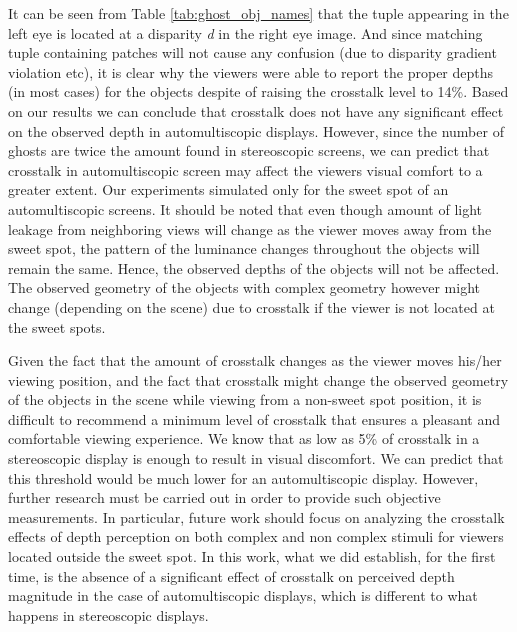 It can be seen from Table \ref{tab:ghost_obj_names} that the tuple appearing in the left eye is located at a disparity \emph{d} in the right eye image. And since matching tuple containing patches will not cause any confusion (due to disparity gradient violation etc), it is clear why the viewers were able to report the proper depths (in most cases) for the objects despite of raising the crosstalk level to 14\%. Based on our results we can conclude that crosstalk does not have any significant effect on the observed depth in automultiscopic displays. However, since the number of ghosts are twice the amount found in stereoscopic screens, we can predict that crosstalk in automultiscopic screen may affect the viewers visual comfort to a greater extent. Our experiments simulated only for the sweet spot of an automultiscopic screens. It should be noted that even though amount of light leakage from neighboring views will change as the viewer moves away from the sweet spot, the pattern of the luminance changes throughout the objects will remain the same. Hence, the observed depths of the objects will not be affected. The observed geometry of the objects with complex geometry however might change (depending on the scene) due to crosstalk if the viewer is not located at the sweet spots.

Given the fact that the amount of crosstalk changes as the viewer moves his/her viewing position, and the fact that crosstalk might change the observed geometry of the objects in the scene while viewing from a non-sweet spot position, it is difficult to recommend a minimum level of crosstalk that ensures a pleasant and comfortable viewing experience. We know that as low as 5\% of crosstalk in a stereoscopic display is enough to result in visual discomfort. We can predict that this threshold would be much lower for an automultiscopic display. However, further research must be carried out in order to provide such objective measurements. In particular, future work should focus on analyzing the crosstalk effects of depth perception on both complex and non complex stimuli for viewers located outside the sweet spot. In this work, what we did establish, for the first time, is the absence of a significant effect of crosstalk on perceived depth magnitude in the case of automultiscopic displays, which is different to what happens in stereoscopic displays.

